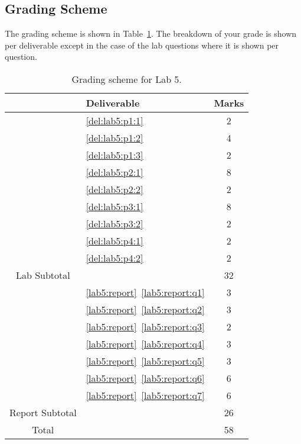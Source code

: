 \subsection{Grading Scheme}
The grading scheme is shown in Table~\ref{tab:lab5:grading}. The breakdown of
your grade is shown per deliverable except in the case of the lab
questions where it is shown per question.
%
\begin{table}[H]
\centering
\caption[Grading Scheme for Lab 5]{Grading scheme for Lab 5.}
\label{tab:lab5:grading}
\begin{tabular}{c|l|c}
        & Deliverable           & Marks  \\ \hline
        & \ref{del:lab5:p1:1}         & 2       \\ \hline
        & \ref{del:lab5:p1:2}         & 4       \\ \hline
        & \ref{del:lab5:p1:3}         & 2      \\ \hline
        & \ref{del:lab5:p2:1}         & 8      \\ \hline
        & \ref{del:lab5:p2:2}         & 2       \\ \hline
        & \ref{del:lab5:p3:1}         & 8       \\ \hline
        & \ref{del:lab5:p3:2}         & 2       \\ \hline
        & \ref{del:lab5:p4:1}         & 2       \\ \hline
        & \ref{del:lab5:p4:2}         & 2       \\ \hhline{=|=|=}
Lab Subtotal&                       & 32      \\ \hhline{=|=|=}
        & \ref{lab5:report}~\ref{lab5:report:q1}  & 3       \\ \hline
        & \ref{lab5:report}~\ref{lab5:report:q2}  & 3       \\ \hline
        & \ref{lab5:report}~\ref{lab5:report:q3}  & 2       \\ \hline
        & \ref{lab5:report}~\ref{lab5:report:q4}  & 3      \\ \hline
        & \ref{lab5:report}~\ref{lab5:report:q5}  & 3      \\ \hline
        & \ref{lab5:report}~\ref{lab5:report:q6}  & 6      \\ \hline
        & \ref{lab5:report}~\ref{lab5:report:q7}  & 6      \\ \hhline{=|=|=}
Report Subtotal&  & 26 \\ \hhline{=|=|=}
  Total &                       & 58
\end{tabular}
\end{table}
%
